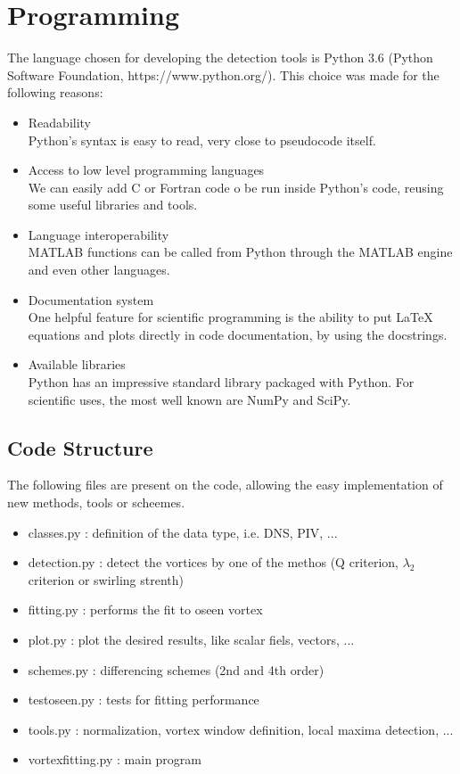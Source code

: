 \documentclass[12pt, a4paper, openany]{memoir}
\begin{document}
\section{Programming}

The language chosen for developing the detection tools is Python 3.6 (Python Software Foundation, https://www.python.org/). This choice was made for the following reasons:
\begin{itemize}
	\item Readability \\
	Python's syntax is easy to read, very close to pseudocode itself.
	\item Access to low level programming languages \\
	We can easily add C or Fortran code o be run inside Python's code, reusing some useful libraries and tools.
	\item Language interoperability \\
	MATLAB functions can be called from Python through the MATLAB engine and even other languages.
	\item Documentation system \\
	One helpful feature for scientific programming is the ability to put LaTeX equations and plots directly in code documentation, by using the docstrings.
	\item Available libraries \\
	Python has an impressive standard library packaged with Python. For scientific uses, the most well known are NumPy and SciPy.
\end{itemize} 

\newpage
\subsection{Code Structure}

The following files are present on the code, allowing the easy implementation of new methods, tools or scheemes.

\begin{itemize}
	\item classes.py : definition of the data type, i.e. DNS, PIV, ...
	\item detection.py : detect the vortices by one of the methos (Q criterion, $\lambda_2$ criterion or swirling strenth)
	\item fitting.py : performs the fit to oseen vortex
	\item plot.py : plot the desired results, like scalar fiels, vectors, ...
	\item schemes.py : differencing schemes (2nd and 4th order)
	\item testoseen.py : tests for fitting performance
	\item tools.py : normalization, vortex window definition, local maxima detection, ... 
	\item vortexfitting.py : main program
\end{itemize}
\end{document}
